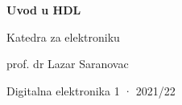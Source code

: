 \begin{frame}[label=07-s001]
\centering
{\fontsize{25}{29}\selectfont\bfseries Uvod u HDL\par}
\vspace{8mm}
Katedra za elektroniku\par
prof. dr Lazar Saranovac\par\vspace{5mm}
Digitalna elektronika 1 · 2021/22
\end{frame}

